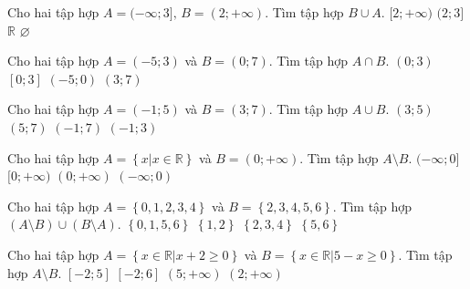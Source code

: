 \begin{ex}%
	Cho hai tập hợp $A = (-\infty; 3],\, B= (2; +\infty)$. Tìm tập hợp $B \cup A$.
	\choice
	{$[2; +\infty)$}
	{$(2; 3]$}
	{\True $\mathbb{R}$}
	{$\varnothing$}
\end{ex}

\begin{ex}%
	Cho hai tập hợp $A=(-5;3)$ và $B=(0;7)$. Tìm tập hợp $A\cap B$.
	\choice
	{\True $(0;3)$}
	{$[0;3]$}
	{$(-5;0)$}
	{$(3;7)$}
\end{ex}

\begin{ex}%
	Cho hai tập hợp $A=(-1;5)$ và $B=(3;7)$. Tìm tập hợp $A\cup B$.
	\choice
	{$(3;5)$}
	{$(5;7)$}
	{\True $(-1;7)$}
	{$(-1;3)$}
\end{ex}

\begin{ex}%
	Cho hai tập hợp $A=\left\{x\big| x\in\mathbb{R}\right\}$ và $B=(0;+\infty)$. Tìm tập hợp $A\setminus B$.
	\choice
	{\True $(-\infty;0]$}
	{$[0;+\infty)$}
	{$(0;+\infty)$}
	{$(-\infty;0)$}
	\loigiai{
		Ta có $A=\mathbb{R}$, suy ra $A\setminus B=\left(-\infty;0\right]$.	
	}
\end{ex}

\begin{ex}%
	Cho hai tập hợp $A =\left\{0,1,2, 3, 4 \right\}$ và $B =\left\{ 2, 3, 4, 5, 6\right\}$. Tìm tập hợp $(A \setminus B) \cup (B \setminus A)$.
	\choice
	{\True $\left\{ 0, 1, 5, 6 \right\}$}
	{$\left\{ 1, 2 \right\}$}
	{$\left\{ 2, 3, 4 \right\}$}
	{$\left\{ 5, 6 \right\}$}
\end{ex}

\begin{ex}%
	Cho hai tập hợp $A=\left\{ x\in \mathbb{R}\big| x+2\geq 0 \right\}$ và $B=\left\{ x\in \mathbb{R}\big| 5-x\geq 0 \right\}$. Tìm tập hợp $A \setminus B$. 
	\choice
	{$\left[ -2;5 \right]$}
	{$\left[ -2;6 \right]$}
	{\True $\left( 5;+\infty  \right)$}
	{$\left( 2;+\infty  \right)$}
\end{ex}

